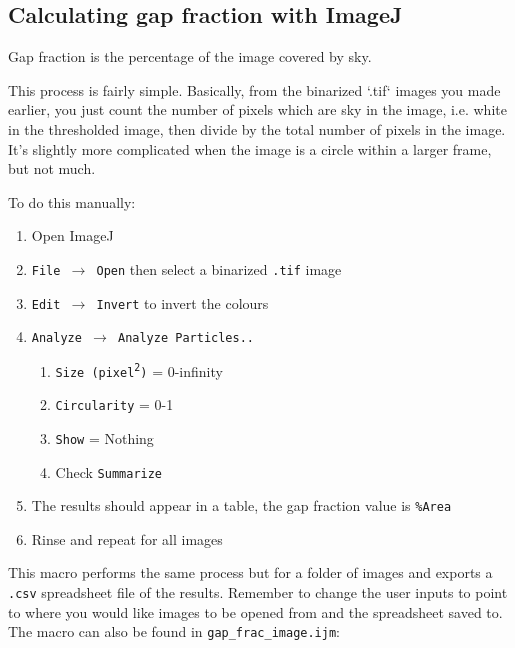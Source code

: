 \documentclass{article}
\begin{document}
\subsection{Calculating gap fraction with ImageJ}

Gap fraction is the percentage of the image covered by sky.

This process is fairly simple. Basically, from the binarized `.tif` images you made earlier, you just count the number of pixels which are sky in the image, i.e. white in the thresholded image, then divide by the total number of pixels in the image. It's slightly more complicated when the image is a circle within a larger frame, but not much.

To do this manually:

\begin{enumerate}
	\item{Open ImageJ}
	\item{\texttt{File $\rightarrow$ Open} then select a binarized \texttt{.tif} image} 
	\item{\texttt{Edit $\rightarrow$ Invert} to invert the colours}
	\item{\texttt{Analyze $\rightarrow$ Analyze Particles..}}
		\begin{enumerate}
			\item{\texttt{Size (pixel\textsuperscript{2})} = 0-infinity}
			\item{\texttt{Circularity} = 0-1}
			\item{\texttt{Show} = Nothing}
			\item{Check \texttt{Summarize}}
		\end{enumerate}
	\item{The results should appear in a table, the gap fraction value is \texttt{\%Area}}
	\item{Rinse and repeat for all images}
\end{enumerate}

This macro performs the same process but for a folder of images and exports a \texttt{.csv} spreadsheet file of the results. Remember to change the user inputs to point to where you would like images to be opened from and the spreadsheet saved to. The macro can also be found in \texttt{gap\_frac\_image.ijm}:
\end{document}
